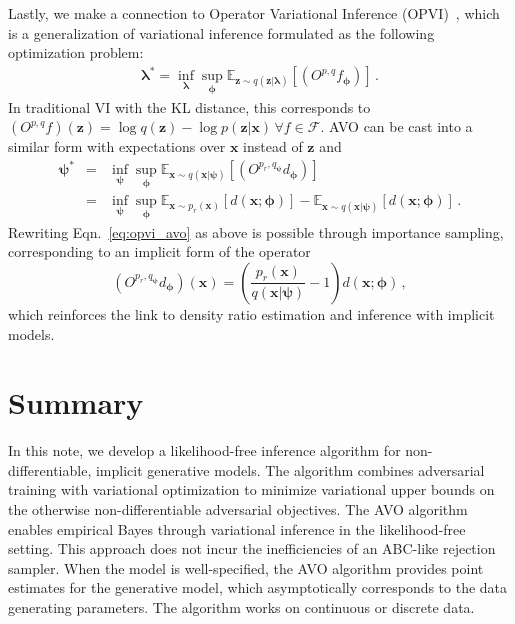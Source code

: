 \documentclass{article}
\newcommand{\bfpsi}{{\bm \psi}}
\newcommand{\bfphi}{{\bm \phi}}
\newcommand{\bflambda}{{\bm \lambda}}
\newcommand{\bfx}{\mathbf{x}}
\newcommand{\bfz}{\mathbf{z}}
\theoremstyle{plain}
\begin{document}
Lastly, we make a connection to Operator Variational Inference (OPVI)~\cite{2016arXiv161009033R},
which is a generalization of variational inference formulated as the following optimization problem:
\begin{eqnarray}
\bflambda^* = \inf_\bflambda \sup_\bfphi \mathbb{E}_{ \bfz \sim q( \bfz | \bflambda)} [ (O^{p,q} f_\bfphi) ] \, .
\end{eqnarray}
In traditional VI with the KL distance, this corresponds to $(O^{p,q} f)(\bfz) = \log q(\bfz) - \log p(\bfz|\bfx) \, \forall f \in \mathcal{F}$.
AVO can be cast into a similar form with expectations over $\bfx$ instead of $\bfz$ and
\begin{eqnarray} \label{eq:opvi_avo}
\bfpsi^* &=& \inf_\bfpsi \sup_\bfphi \mathbb{E}_{ \bfx \sim q( \bfx | \bfpsi)} [ (O^{p_r,q_\bfpsi} d_\bfphi) ] \\
\label{eq:opvi_avo2} &=&  \inf_\bfpsi \sup_\bfphi \mathbb{E}_{\bfx\sim p_r(\bfx)}[d(\bfx; \bfphi)] - \mathbb{E}_{\bfx \sim q(\bfx|\bfpsi)}[d(\bfx; \bfphi)] \nonumber \, .
\end{eqnarray}
Rewriting Eqn.~\ref{eq:opvi_avo} as above is possible through importance sampling,
corresponding to an implicit form of the operator
\begin{equation}
(O^{p_r,q_\bfpsi} d_\bfphi)(\bfx) = \left( \frac{p_r(\bfx)}{q(\bfx|\bfpsi)}  -1 \right) d(\bfx; \bfphi) \, ,
\end{equation}
which reinforces the link to density ratio estimation and inference with implicit models.



\section{Summary}

In this note, we develop a likelihood-free inference algorithm for
non-differentiable, implicit generative models. The algorithm combines
adversarial training  with variational optimization to minimize variational
upper bounds  on the otherwise non-differentiable adversarial objectives. The
AVO algorithm enables empirical Bayes through variational inference in the
likelihood-free setting. This approach does not incur the inefficiencies of an
ABC-like rejection sampler. When the model is well-specified, the AVO algorithm
provides point estimates for
the generative model, which asymptotically corresponds to the data generating
parameters. The algorithm works on continuous or discrete data.
\end{document}
